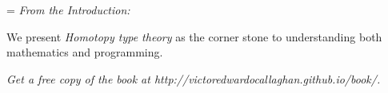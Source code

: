 %
%



{
\parindent=0pt
\parskip=\baselineskip
{\textit{From the Introduction:}}


We present \emph{Homotopy type theory} as the corner stone to understanding
both mathematics and programming.

\bigskip

\begin{center}
  {\Large
  \textit{Get a free copy of the book at http://victoredwardocallaghan.github.io/book/.}}
\end{center}
}
